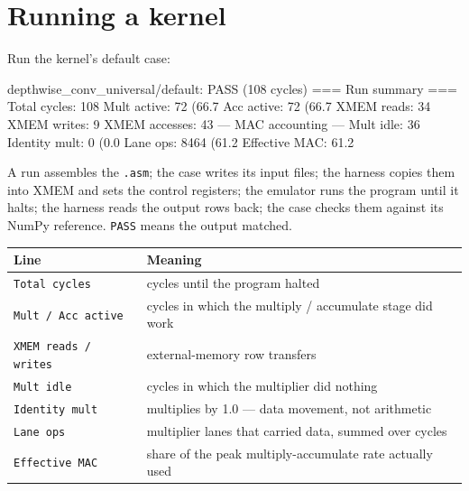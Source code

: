 \documentclass[11pt,a4paper]{article}
\begin{document}
\section{Running a kernel}

\needspace{8.6cm}
Run the kernel's default case:

\begin{termout}
depthwise_conv_universal/default: PASS (108 cycles)
=== Run summary ===
Total cycles:             108
Mult active:               72  (66.7%
Acc  active:               72  (66.7%
XMEM reads:                34
XMEM writes:                9
XMEM accesses:             43
--- MAC accounting ---
Mult idle:                 36
Identity mult:              0  (0.0%
Lane ops:                8464  (61.2%
Effective MAC:          61.2%
\end{termout}

A run assembles the \texttt{.asm}; the case writes its input files; the harness
copies them into XMEM and sets the control registers; the emulator runs the
program until it halts; the harness reads the output rows back; the case checks
them against its NumPy reference. \texttt{PASS} means the output matched.

\begin{center}
\begin{tabularx}{\linewidth}{lX}
\toprule
Line & Meaning \\
\midrule
\texttt{Total cycles} & cycles until the program halted \\
\texttt{Mult / Acc active} & cycles in which the multiply / accumulate stage did work \\
\texttt{XMEM reads / writes} & external-memory row transfers \\
\texttt{Mult idle} & cycles in which the multiplier did nothing \\
\texttt{Identity mult} & multiplies by 1.0 --- data movement, not arithmetic \\
\texttt{Lane ops} & multiplier lanes that carried data, summed over cycles \\
\texttt{Effective MAC} & share of the peak multiply-accumulate rate actually used \\
\bottomrule
\end{tabularx}
\end{center}
\end{document}
